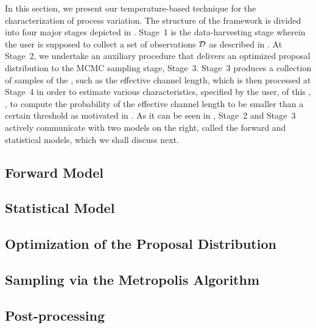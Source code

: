 
In this section, we present our temperature-based technique for the characterization of process variation. The structure of the framework is divided into four major stages depicted in .
Stage~1 is the data-harvesting stage wherein the user is supposed to collect a set of observations $\mathcal{D}$ as described in .
At Stage~2, we undertake an auxiliary procedure that delivers an optimized proposal distribution to the MCMC sampling stage, Stage~3.
Stage~3 produces a collection of samples of the \qoi, such as the effective channel length, which is then processed at Stage~4 in order to estimate various characteristics, specified by the user, of this \qoi, \eg, to compute the probability of the effective channel length to be smaller than a certain threshold as motivated in .
As it can be seen in , Stage~2 and Stage~3 actively communicate with two models on the right, called the forward and statistical models, which we shall discuss next.

\subsection{Forward Model}   


\subsection{Statistical Model} 


\subsection{Optimization of the Proposal Distribution} 


\subsection{Sampling via the Metropolis Algorithm} 


\subsection{Post-processing} 

